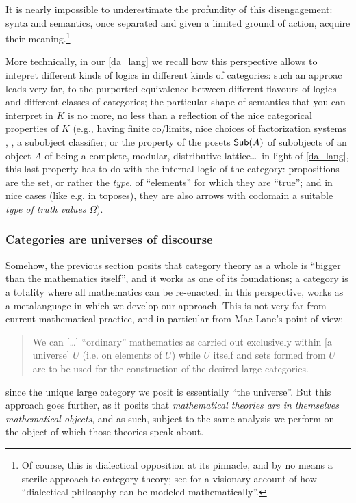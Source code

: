 It is nearly impossible to underestimate the profundity of this disengagement: synta and semantics, once separated and given a limited ground of action, acquire their meaning.\footnote{Of course, this is dialectical opposition at its pinnacle, and by no means a sterile approach to category theory; see \cite{lawvere1996unity} for a visionary account of how ``dialectical philosophy can be modeled mathematically''.} 

More technically, in our \autoref{da_lang} we recall how this perspective allows to intepret different kinds of logics in different kinds of categories: such an approac leads very far, to the purported equivalence between different flavours of logic\emph{s} and different classes of categories; the particular shape of semantics that you can interpret in $K$ is no more, no less than a reflection of the nice categorical properties of $K$ (e.g., having finite co/limits, nice choices of factorization systems \cite[??]{Bor1}, \cite{FK}, a subobject classifier; or the property of the posets $\mathsf{Sub}(A)$ of subobjects of an object $A$ of being a complete, modular, distributive lattice\dots --in light of \autoref{da_lang}, this last property has to do with the internal logic of the category: propositions are the set, or rather the \emph{type}, of ``elements'' for which they are ``true''; and in nice cases (like e.g. in toposes), they are also arrows with codomain a suitable \emph{type of truth values} $\Omega$).
\subsubsection{Categories are universes of discourse}
Somehow, the previous section posits that category theory as a whole is ``bigger than the mathematics itself'', and it works as one of its foundations; a category is a totality where all mathematics can be re-enacted; in this perspective,  works as a metalanguage in which we develop our approach. This is not very far from current mathematical practice, and in particular from Mac Lane's point of view: 
\begin{quote}
	We can [\dots\unkern] ``ordinary'' mathematics as carried out exclusively within [a universe] $U$ (i.e. on elements of $U$) while $U$ itself and sets formed from $U$ are to be used for the construction of the desired large categories.\hfill \cite[I.6]{McL}
\end{quote}
since the unique large category we posit is essentially ``the universe''. But this approach goes further, as it posits that \emph{mathematical theories are in themselves mathematical objects}, and as such, subject to the same analysis we perform on the object of which those theories speak about.%

